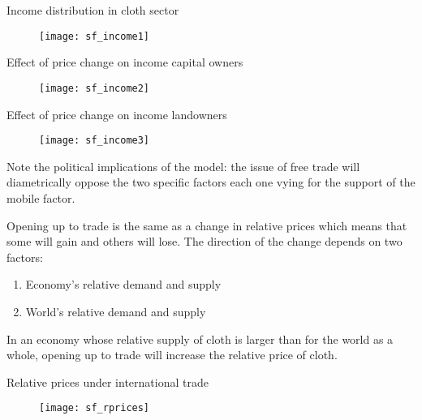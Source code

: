 \documentclass{beamer}
\begin{document}
\begin{frame}{Income distribution in cloth sector}
  \begin{figure}
    \texttt{[image: sf\_income1]}
  \end{figure}
\end{frame}

\begin{frame}{Effect of price change on income capital owners}
  \begin{figure}
    \texttt{[image: sf\_income2]}
  \end{figure}
\end{frame}

\begin{frame}{Effect of price change on income landowners}
  \begin{figure}
    \texttt{[image: sf\_income3]}
  \end{figure}
\end{frame}

\begin{frame}
 Note the political implications of the model: the issue of free trade will diametrically oppose the two specific factors each one vying for the support of the mobile factor.
\end{frame}

\begin{frame}
  Opening up to trade is the same as a change in relative prices which means that some will gain and others will lose. 
  The direction of the change depends on two factors:
  \begin{enumerate}
    \item Economy's relative demand and supply
    \item World's relative demand and supply
  \end{enumerate}
  \medskip
  In an economy whose relative supply of cloth is larger than for the world as a whole, opening up to trade will increase the relative price of cloth. 
\end{frame}

\begin{frame}{Relative prices under international trade}
  \begin{figure}
    \texttt{[image: sf\_rprices]}
  \end{figure}
\end{frame}
\end{document}
